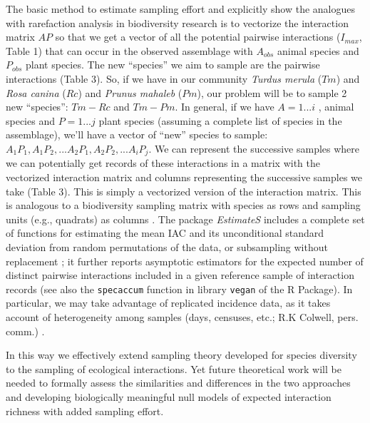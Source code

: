 \documentclass[12pt]{article}
\begin{document}
The basic method to estimate sampling effort and explicitly show the analogues with rarefaction analysis in biodiversity research is to vectorize the interaction matrix $AP$ so that we get a vector of all the potential pairwise interactions ($I_{max}$, Table 1) that can occur in the observed assemblage with $A_{obs}$ animal species and $P_{obs}$ plant species. The new ``species'' we aim to sample are the pairwise interactions (Table 3). So, if we have in our community \emph{Turdus merula} ($Tm$) and \emph{Rosa canina} ($Rc$) and \emph{Prunus mahaleb} ($Pm$), our problem will be to sample 2 new ``species'': $Tm-Rc$ and $Tm-Pm$. In general, if we have $A= 1... i$ , animal species and $P = 1... j$ plant species (assuming a complete list of species in the assemblage), we'll have a vector of ``new'' species to sample: $A_1P_1, A_1P_2,... A_2P_1, A_2P_2, ... A_iP_j$. We can represent the successive samples where we can potentially get records of these interactions in a matrix with the vectorized interaction matrix and columns representing the successive samples we take (Table 3). This is simply a vectorized version of the interaction matrix. This is analogous to a biodiversity sampling matrix with species as rows and sampling units (e.g., quadrats) as columns \citep{Jordano:2009c}. The package \emph{EstimateS} \citep{Colwell:2013kj} includes a complete set of functions for estimating the mean IAC and its unconditional standard deviation from random permutations of the data, or subsampling without replacement \citep{Gotelli:2001uo}; it further reports asymptotic estimators for the expected number of distinct pairwise interactions included in a given reference sample of interaction records (see also the \texttt{specaccum} function in library \texttt{vegan} of the R Package)\citep{RCoreTeam:2010,Jordano:2009c,Olesen:2011a}. In particular, we may take advantage of replicated incidence data, as it takes account of heterogeneity among samples (days, censuses, etc.; R.K Colwell, pers. comm.) \citep[see also ][]{Colwell:2004fi,Colwell:2012fc,Chao:2014wm}.

In this way we effectively extend sampling theory developed for species diversity to the sampling of ecological interactions. Yet future theoretical work will be needed to formally assess the similarities and differences in the two approaches and developing biologically meaningful null models of expected interaction richness with added sampling effort.

\end{document}
